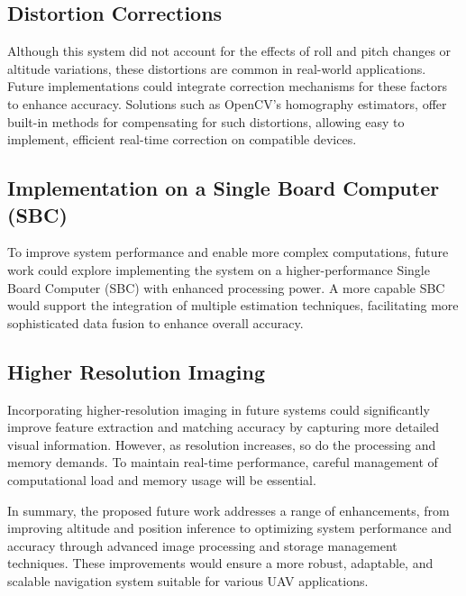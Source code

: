 \subsection{Distortion Corrections}

Although this system did not account for the effects of roll and pitch changes or altitude variations, these distortions are common in real-world applications. Future implementations could integrate correction mechanisms for these factors to enhance accuracy. Solutions such as OpenCV’s homography estimators, offer built-in methods for compensating for such distortions, allowing easy to implement, efficient real-time correction on compatible devices.


\subsection{Implementation on a Single Board Computer (SBC)}

To improve system performance and enable more complex computations, future work could explore implementing the system on a higher-performance Single Board Computer (SBC) with enhanced processing power. A more capable SBC would support the integration of multiple estimation techniques, facilitating more sophisticated data fusion to enhance overall accuracy. 

\subsection{Higher Resolution Imaging}

Incorporating higher-resolution imaging in future systems could significantly improve feature extraction and matching accuracy by capturing more detailed visual information. However, as resolution increases, so do the processing and memory demands. To maintain real-time performance, careful management of computational load and memory usage will be essential. 


In summary, the proposed future work addresses a range of enhancements, from improving altitude and position inference to optimizing system performance and accuracy through advanced image processing and storage management techniques. These improvements would ensure a more robust, adaptable, and scalable navigation system suitable for various UAV applications.


